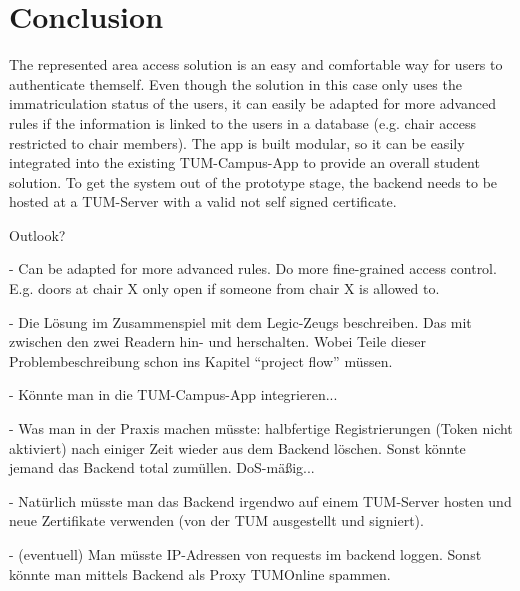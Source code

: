 \section{Conclusion}\label{sec:conclusion}

The represented area access solution is an easy and comfortable way for users to authenticate themself. Even though the solution in this case only uses
the immatriculation status of the users, it can easily be adapted for more advanced rules if the information is linked to the users in a database (e.g. chair access restricted to chair members).
The app is built modular, so it can be easily integrated into the existing TUM-Campus-App to provide an overall student solution. To get the system out of the prototype stage, the backend needs to be hosted at a TUM-Server with  a valid not self signed certificate.


Outlook?

- Can be adapted for more advanced rules. Do more fine-grained access control. E.g. doors at chair X only open if someone from chair X is allowed to.

- Die Lösung im Zusammenspiel mit dem Legic-Zeugs beschreiben. Das mit zwischen den zwei Readern hin- und herschalten.
Wobei Teile dieser Problembeschreibung schon ins Kapitel ``project flow'' müssen.

- Könnte man in die TUM-Campus-App integrieren...

- Was man in der Praxis machen müsste: halbfertige Registrierungen (Token nicht aktiviert) nach einiger Zeit wieder aus dem Backend löschen. Sonst könnte jemand das Backend total zumüllen. DoS-mäßig...

- Natürlich müsste man das Backend irgendwo auf einem TUM-Server hosten und neue Zertifikate verwenden (von der TUM ausgestellt und signiert).

- (eventuell) Man müsste IP-Adressen von requests im backend loggen. Sonst könnte man mittels Backend als Proxy TUMOnline spammen.